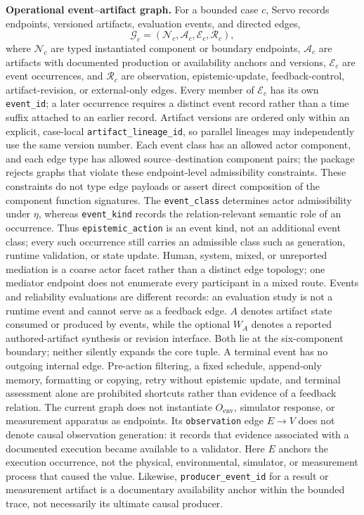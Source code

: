 \documentclass{article}
\begin{document}
\noindent\textbf{Operational event--artifact graph.}
For a bounded case $c$, Servo records endpoints, versioned artifacts, evaluation events, and directed edges,
\begin{equation}
  \mathcal G_c=(\mathcal N_c,\mathcal A_c,\mathcal E_c,\mathcal R_c),
  \label{eq:operational-loop}
\end{equation}
where $\mathcal N_c$ are typed instantiated component or boundary endpoints, $\mathcal A_c$ are artifacts with documented production or availability anchors and versions, $\mathcal E_c$ are event occurrences, and $\mathcal R_c$ are observation, epistemic-update, feedback-control, artifact-revision, or external-only edges. Every member of $\mathcal E_c$ has its own \texttt{event\_id}; a later occurrence requires a distinct event record rather than a time suffix attached to an earlier record. Artifact versions are ordered only within an explicit, case-local \texttt{artifact\_lineage\_id}, so parallel lineages may independently use the same version number. Each event class has an allowed actor component, and each edge type has allowed source--destination component pairs; the package rejects graphs that violate these endpoint-level admissibility constraints. These constraints do not type edge payloads or assert direct composition of the component function signatures. The \texttt{event\_class} determines actor admissibility under $\eta$, whereas \texttt{event\_kind} records the relation-relevant semantic role of an occurrence. Thus \texttt{epistemic\_action} is an event kind, not an additional event class; every such occurrence still carries an admissible class such as generation, runtime validation, or state update. Human, system, mixed, or unreported mediation is a coarse actor facet rather than a distinct edge topology; one mediator endpoint does not enumerate every participant in a mixed route. Events and reliability evaluations are different records: an evaluation study is not a runtime event and cannot serve as a feedback edge. $A$ denotes artifact state consumed or produced by events, while the optional $W_A$ denotes a reported authored-artifact synthesis or revision interface. Both lie at the six-component boundary; neither silently expands the core tuple. A terminal event has no outgoing internal edge. Pre-action filtering, a fixed schedule, append-only memory, formatting or copying, retry without epistemic update, and terminal assessment alone are prohibited shortcuts rather than evidence of a feedback relation. The current graph does not instantiate $O_{\mathrm{env}}$, simulator response, or measurement apparatus as endpoints. Its \texttt{observation} edge $E\rightarrow V$ does not denote causal observation generation: it records that evidence associated with a documented execution became available to a validator. Here $E$ anchors the execution occurrence, not the physical, environmental, simulator, or measurement process that caused the value. Likewise, \texttt{producer\_event\_id} for a result or measurement artifact is a documentary availability anchor within the bounded trace, not necessarily its ultimate causal producer.
\end{document}
